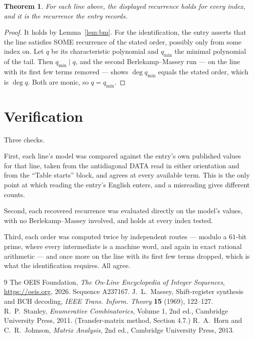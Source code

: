 \documentclass[11pt,a4paper]{article}
\theoremstyle{plain}
\newtheorem{theorem}{Theorem}
\theoremstyle{definition}
\begin{document}
\begin{theorem}
For each line above, the displayed recurrence holds for every index, and it is the recurrence
the entry records.
\end{theorem}

\begin{proof}
It holds by Lemma~\ref{lem:bm}. For the identification, the entry asserts that the line
satisfies SOME recurrence of the stated order, possibly only from some index on. Let $q$ be its
characteristic polynomial and $q_{\min}$ the minimal polynomial of the tail. Then
$q_{\min}\mid q$, and the second Berlekamp--Massey run --- on the line with its first few
terms removed --- shows $\deg q_{\min}$ equals the stated order, which is $\deg q$. Both are
monic, so $q=q_{\min}$.
\end{proof}

\section{Verification}

Three checks.

First, each line's model was compared against the entry's own published values for that line,
taken from the antidiagonal DATA read in either orientation and from the ``Table starts''
block, and agrees at every available term. This is the only point at which reading the entry's
English enters, and a misreading gives different counts.

Second, each recovered recurrence was evaluated directly on the model's values, with no
Berlekamp--Massey involved, and holds at every index tested.

Third, each order was computed twice by independent routes --- modulo a $61$-bit prime, where
every intermediate is a machine word, and again in exact rational arithmetic --- and once more
on the line with its first few terms dropped, which is what the identification requires. All
agree.

\begin{thebibliography}{9}
 The OEIS Foundation, \emph{The On-Line Encyclopedia of Integer
Sequences}, \url{https://oeis.org}, 2026. Sequence A237167.
 J.~L.~Massey, Shift-register synthesis and BCH decoding, \emph{IEEE
Trans. Inform. Theory} \textbf{15} (1969), 122--127.
 R.~P.~Stanley, \emph{Enumerative Combinatorics}, Volume 1, 2nd ed.,
Cambridge University Press, 2011. (Transfer-matrix method, Section 4.7.)
 R.~A.~Horn and C.~R.~Johnson, \emph{Matrix Analysis}, 2nd ed., Cambridge
University Press, 2013.
\end{thebibliography}
\end{document}
